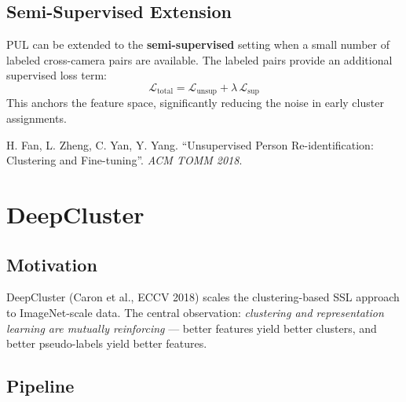 \documentclass[11pt,a4paper]{article}
\theoremstyle{definition}
\theoremstyle{plain}
\theoremstyle{remark}
\begin{document}
\subsection{Semi-Supervised Extension}

PUL can be extended to the \textbf{semi-supervised} setting when a small number of labeled cross-camera pairs are available. The labeled pairs provide an additional supervised loss term:
\begin{equation*}
    \mathcal{L}_\text{total} = \mathcal{L}_\text{unsup} + \lambda\,\mathcal{L}_\text{sup}
\end{equation*}
This anchors the feature space, significantly reducing the noise in early cluster assignments.

\begin{tcolorbox}[colback=blue!5!white,colframe=blue!60!black,title={Reference}]
H. Fan, L. Zheng, C. Yan, Y. Yang. ``Unsupervised Person Re-identification: Clustering and Fine-tuning''. \textit{ACM TOMM 2018}.
\end{tcolorbox}


\section{DeepCluster}

\subsection{Motivation}

DeepCluster (Caron et al., ECCV 2018) scales the clustering-based SSL approach to ImageNet-scale data. The central observation: \textit{clustering and representation learning are mutually reinforcing} --- better features yield better clusters, and better pseudo-labels yield better features.

\subsection{Pipeline}
\end{document}
